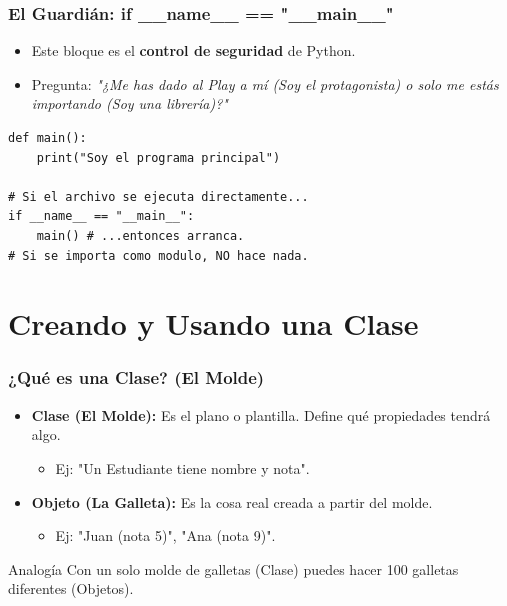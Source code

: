 \documentclass[11pt]{beamer}
\begin{document}
\begin{frame}[fragile]\frametitle{El Guardián: if \_\_name\_\_ == "\_\_main\_\_"}
\begin{itemize}
    \item Este bloque es el \textbf{control de seguridad} de Python.
    \item Pregunta: \textit{"¿Me has dado al Play a mí (Soy el protagonista) o solo me estás importando (Soy una librería)?"}
\end{itemize}
\begin{lstlisting}[basicstyle=\scriptsize]
def main():
    print("Soy el programa principal")

# Si el archivo se ejecuta directamente...
if __name__ == "__main__":
    main() # ...entonces arranca.
# Si se importa como modulo, NO hace nada.
\end{lstlisting}
\end{frame}


\section{Creando y Usando una Clase}

\begin{frame}[fragile]\frametitle{¿Qué es una Clase? (El Molde)}
\begin{itemize}
    \item \textbf{Clase (El Molde):} Es el plano o plantilla. Define qué propiedades tendrá algo.
        \begin{itemize}
        \item Ej: "Un Estudiante tiene nombre y nota".
        \end{itemize}
    \item \textbf{Objeto (La Galleta):} Es la cosa real creada a partir del molde.
        \begin{itemize}
        \item Ej: "Juan (nota 5)", "Ana (nota 9)".
        \end{itemize}
\end{itemize}
\begin{block}{Analogía}
Con un solo molde de galletas (Clase) puedes hacer 100 galletas diferentes (Objetos).
\end{block}
\end{frame}
\end{document}
